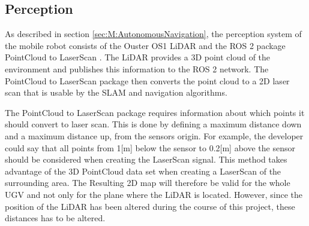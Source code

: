 
\subsection{Perception}\label{sec:M:AN:Perception}
As described in section \ref{sec:M:AutonomousNavigation}, the perception system of the mobile robot consists of the Ouster OS1 LiDAR and the ROS 2 package PointCloud to LaserScan \cite{pointcloud_to_laserscan_repo}. The LiDAR provides a 3D point cloud of the environment and publishes this information to the ROS 2 network. The PointCloud to LaserScan package then converts the point cloud to a 2D laser scan that is usable by the SLAM and navigation algorithms.

The PointCloud to LaserScan package requires information about which points it should convert to laser scan. This is done by defining a maximum distance down and a maximum distance up, from the sensors origin. For example, the developer could say that all points from 1[m] below the sensor to 0.2[m] above the sensor should be considered when creating the LaserScan signal. This method takes advantage of the 3D PointCloud data set when creating a LaserScan of the surrounding area. The Resulting 2D map will therefore be valid for the whole UGV and not only for the plane where the LiDAR is located. However, since the position of the LiDAR has been altered during the course of this project, these distances has to be altered.




